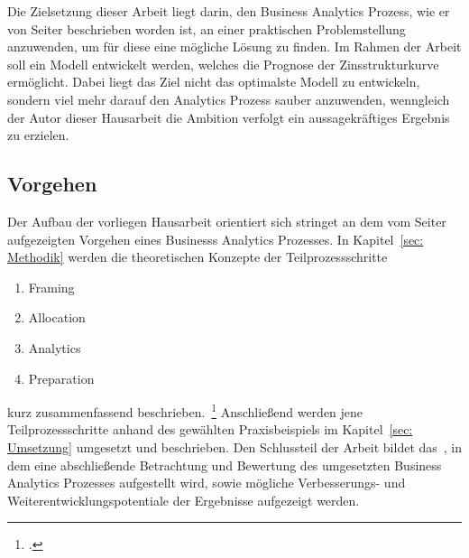 Die Zielsetzung dieser Arbeit liegt darin, den Business Analytics Prozess, wie er von Seiter beschrieben worden ist, an
einer praktischen Problemstellung anzuwenden, um für diese eine mögliche Lösung zu finden.
Im Rahmen der Arbeit soll ein Modell entwickelt werden, welches die Prognose der Zinsstrukturkurve ermöglicht.
Dabei liegt das Ziel nicht das optimalste Modell zu entwickeln, sondern viel mehr darauf den Analytics Prozess sauber
anzuwenden, wenngleich der Autor dieser Hausarbeit die Ambition verfolgt ein aussagekräftiges Ergebnis zu erzielen.

\subsection{Vorgehen} \label{sec: Vorgehen}
Der Aufbau der vorliegen Hausarbeit orientiert sich stringet an dem vom Seiter aufgezeigten Vorgehen eines Businesss
Analytics Prozesses.
In Kapitel~\ref{sec: Methodik} werden die theoretischen Konzepte der Teilprozessschritte
\begin{enumerate}
    \item Framing
    \item Allocation
    \item Analytics
    \item Preparation
\end{enumerate}
kurz zusammenfassend beschrieben.~\footcite[\vglf][]{seiter.2019}
Anschließend werden jene Teilprozessschritte anhand des gewählten Praxisbeispiels im Kapitel~\ref{sec: Umsetzung}
umgesetzt und beschrieben.
Den Schlussteil der Arbeit bildet das~, in dem eine abschließende Betrachtung und Bewertung des
umgesetzten Business Analytics Prozesses aufgestellt wird, sowie mögliche Verbesserungs- und Weiterentwicklungspotentiale
der Ergebnisse aufgezeigt werden.
